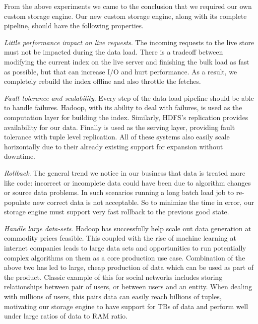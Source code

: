 From the above experiments we came to the conclusion that we required
our own custom storage engine. Our new custom storage engine, along
with its complete pipeline, should have the following properties. 
\begin{compactitem}
\item \emph{Little performance impact on live requests}. The incoming
requests to the live store must not be impacted during the data load.
There is a tradeoff between modifying the current index on the live
server and finishing the bulk load as fast as possible, but that can
increase I/O and hurt performance. As a result, we completely rebuild
the index offline and also throttle the fetches. 
\item \emph{Fault tolerance and scalability}. Every step of the data
load pipeline should be able to handle failures. Hadoop, with its
ability to deal with failures, is used as the computation layer for
building the index. Similarly, HDFS's replication provides
availability for our data. Finally \projectname{} is used as the 
serving layer, providing fault tolerance with tuple level replication. 
All of these systems also easily scale horizontally due to
their already existing support for expansion without downtime. 
\item \emph{Rollback}. The general trend we notice in our business
that data is treated more like code: incorrect or incomplete data
could have been due to algorithm changes or source data problems. 
In such scenarios running a long batch load job to re-populate new
correct data is not acceptable. So to minimize the time in error, 
our storage engine must support very fast rollback to the previous 
good state.
\item \emph{Handle large data-sets}. Hadoop has successfully help
scale out data generation at commodity prices feasible.
This coupled with the rise of machine learning at internet companies 
leads to large data sets and opportunities to run potentially complex 
algorithms on them as a core production use case. Combination of 
the above two has led to large, cheap production of data which can 
be used as part of the product. Classic example of this for social 
networks includes storing relationships between pair of users,
or between users and an entity. When dealing with millions of users, 
this pairs data can easily reach billions of tuples, motivating
our storage engine to have support for TBs of data and perform 
well under large ratios of data to RAM ratio.
\end{compactitem}

